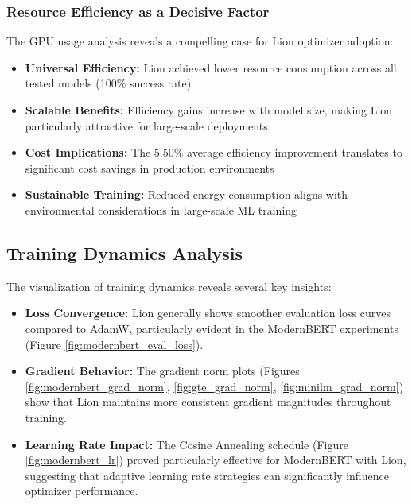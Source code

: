 \subsubsection{Resource Efficiency as a Decisive Factor}

The GPU usage analysis reveals a compelling case for Lion optimizer adoption:

\begin{itemize}
    \item \textbf{Universal Efficiency:} Lion achieved lower resource consumption across all tested models (100\% success rate)
    \item \textbf{Scalable Benefits:} Efficiency gains increase with model size, making Lion particularly attractive for large-scale deployments
    \item \textbf{Cost Implications:} The 5.50\% average efficiency improvement translates to significant cost savings in production environments
    \item \textbf{Sustainable Training:} Reduced energy consumption aligns with environmental considerations in large-scale ML training
\end{itemize}

\subsection{Training Dynamics Analysis}

The visualization of training dynamics reveals several key insights:

\begin{itemize}
    \item \textbf{Loss Convergence:} Lion generally shows smoother evaluation loss curves compared to AdamW, particularly evident in the ModernBERT experiments (Figure \ref{fig:modernbert_eval_loss}).
    
    \item \textbf{Gradient Behavior:} The gradient norm plots (Figures \ref{fig:modernbert_grad_norm}, \ref{fig:gte_grad_norm}, \ref{fig:minilm_grad_norm}) show that Lion maintains more consistent gradient magnitudes throughout training.
    
    \item \textbf{Learning Rate Impact:} The Cosine Annealing schedule (Figure \ref{fig:modernbert_lr}) proved particularly effective for ModernBERT with Lion, suggesting that adaptive learning rate strategies can significantly influence optimizer performance.
\end{itemize}

